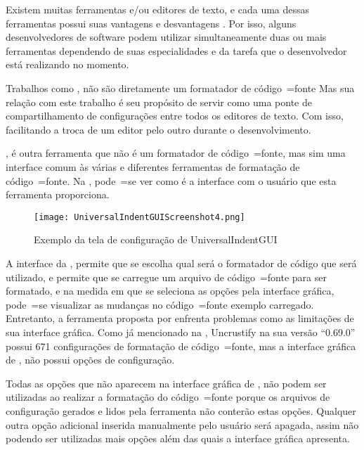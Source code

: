 Existem muitas ferramentas e\slash{}ou editores de texto,
e cada uma dessas ferramentas possui suas vantagens e
desvantagens \cite{prettyPrintingOfVisualSentences,anAbstractPrettyPrinter,improvingRefactoringSpeed}.
Por isso,
alguns desenvolvedores de software podem utilizar simultaneamente duas ou
mais ferramentas dependendo de suas especialidades e
da tarefa que o desenvolvedor está realizando no momento.

Trabalhos como ,
não são diretamente um formatador de código~=fonte Mas sua relação com este trabalho é seu propósito de servir como uma ponte de compartilhamento de configurações entre todos os editores de texto.
Com isso,
facilitando a troca de um editor pelo outro durante o desenvolvimento.

,
é outra ferramenta que não é um formatador de código~=fonte,
mas sim uma interface comum às várias e
diferentes ferramentas de formatação de código~=fonte.
Na ,
pode~=se ver como é a interface com o usuário que esta ferramenta proporciona.

\begin{figure}[!htb]
\caption{Exemplo da tela de configuração de UniversalIndentGUI}
\label{figure:UniversalIndentGUIScreenshot4}
\centering
\texttt{[image: UniversalIndentGUIScreenshot4.png]}
\end{figure}

A interface da ,
permite que se escolha qual será o formatador de código que será utilizado,
e permite que se carregue um arquivo de código~=fonte para ser formatado,
e na medida em que se seleciona as opções pela interface gráfica,
pode~=se visualizar as mudanças no código~=fonte exemplo carregado.
Entretanto,
a ferramenta proposta por  enfrenta problemas como as limitações de sua interface gráfica.
Como já mencionado na ,
Uncrustify na sua versão ``0.69.0'' possui 671 configurações de formatação de código~=fonte,
mas a interface gráfica de ,
não possui  opções de configuração.

Todas as opções que não aparecem na interface gráfica de ,
não podem ser utilizadas ao realizar a formatação do código~=fonte porque os arquivos de configuração gerados e
lidos pela ferramenta não conterão estas opções.
Qualquer outra opção adicional inserida manualmente pelo usuário será apagada,
assim não podendo ser utilizadas mais opções além das quais a interface gráfica apresenta.

